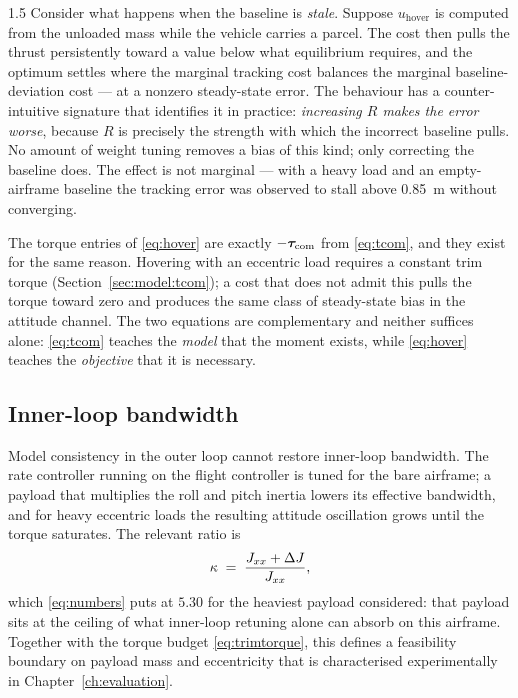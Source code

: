 \begin{spacing}{1.5}
Consider what happens when the baseline is \emph{stale}. Suppose
$u_{\mathrm{hover}}$ is computed from the unloaded mass while the vehicle carries
a parcel. The cost then pulls the thrust persistently toward a value below what
equilibrium requires, and the optimum settles where the marginal tracking cost
balances the marginal baseline-deviation cost --- at a nonzero steady-state
error. The behaviour has a counter-intuitive signature that identifies it in
practice: \emph{increasing $R$ makes the error worse}, because $R$ is precisely
the strength with which the incorrect baseline pulls. No amount of weight tuning
removes a bias of this kind; only correcting the baseline does. The effect is not
marginal --- with a heavy load and an empty-airframe baseline the tracking error
was observed to stall above \SI{0.85}{\meter} without converging.

The torque entries of \eqref{eq:hover} are exactly $-\bm{\tau}_{\mathrm{com}}$ from \eqref{eq:tcom},
and they exist for the same reason. Hovering with an eccentric load requires a
constant trim torque (Section~\ref{sec:model:tcom}); a cost that does not admit
this pulls the torque toward zero and produces the same class of steady-state
bias in the attitude channel. The two equations are complementary and neither
suffices alone: \eqref{eq:tcom} teaches the \emph{model} that the moment exists,
while \eqref{eq:hover} teaches the \emph{objective} that it is necessary.

\subsection{Inner-loop bandwidth}\label{sec:model:gain}

Model consistency in the outer loop cannot restore inner-loop bandwidth. The rate
controller running on the flight controller is tuned for the bare airframe; a
payload that multiplies the roll and pitch inertia lowers its effective
bandwidth, and for heavy eccentric loads the resulting attitude oscillation grows
until the torque saturates. The relevant ratio is
\begin{equation}
\kappa \;=\; \frac{J_{xx} + \Delta J}{J_{xx}},
\label{eq:gain}
\end{equation}
which \eqref{eq:numbers} puts at $5.30$ for the heaviest payload considered: that
payload sits at the ceiling of what inner-loop retuning alone can absorb on this
airframe. Together with the torque budget \eqref{eq:trimtorque}, this defines a
feasibility boundary on payload mass and eccentricity that is characterised
experimentally in Chapter~\ref{ch:evaluation}.


\end{spacing}
